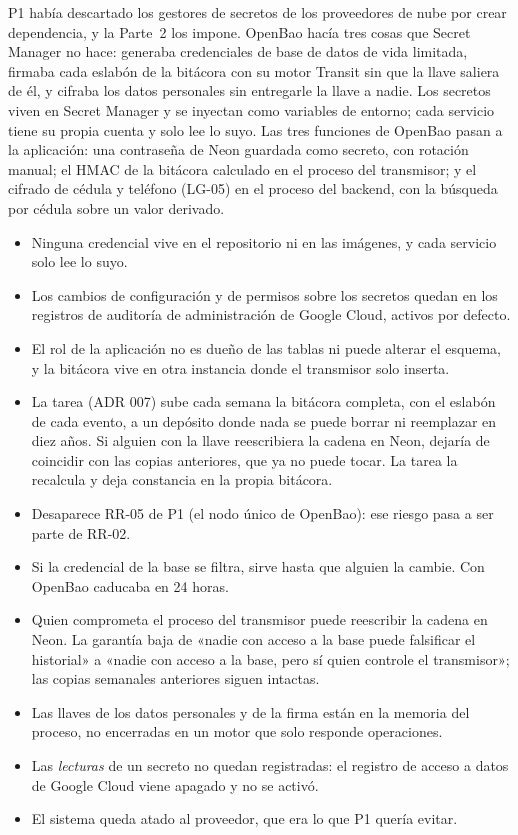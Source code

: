 \documentclass[11pt,a4paper]{article}
\theoremstyle{definition}
\theoremstyle{remark}
\begin{document}
\adrctx P1 había descartado los gestores de secretos de los proveedores de nube
por crear dependencia, y la Parte~2 los impone. OpenBao hacía tres cosas que
Secret Manager no hace: generaba credenciales de base de datos de vida
limitada, firmaba cada eslabón de la bitácora con su motor Transit sin que la
llave saliera de él, y cifraba los datos personales sin entregarle la llave a
nadie.
\adrdec Los secretos viven en Secret Manager y se inyectan como variables de
entorno; cada servicio tiene su propia cuenta y solo lee lo suyo. Las tres
funciones de OpenBao pasan a la aplicación: una contraseña de Neon guardada
como secreto, con rotación manual; el HMAC de la bitácora calculado en el
proceso del transmisor; y el cifrado de cédula y teléfono (LG-05) en el
proceso del backend, con la búsqueda por cédula sobre un valor derivado.
\adrpos
\begin{itemize}
  \item Ninguna credencial vive en el repositorio ni en las imágenes, y cada
    servicio solo lee lo suyo.
  \item Los cambios de configuración y de permisos sobre los secretos quedan
    en los registros de auditoría de administración de Google Cloud, activos
    por defecto.
  \item El rol de la aplicación no es dueño de las tablas ni puede alterar el
    esquema, y la bitácora vive en otra instancia donde el transmisor solo
    inserta.
  \item La tarea  (ADR 007) sube cada semana la bitácora completa,
    con el eslabón de cada evento, a un depósito donde nada se puede borrar ni
    reemplazar en diez años. Si alguien con la llave reescribiera la cadena en
    Neon, dejaría de coincidir con las copias anteriores, que ya no puede
    tocar. La tarea  la recalcula y deja constancia en la propia
    bitácora.
  \item Desaparece RR-05 de P1 (el nodo único de OpenBao): ese riesgo pasa a
    ser parte de RR-02.
\end{itemize}
\adrneg
\begin{itemize}
  \item Si la credencial de la base se filtra, sirve hasta que alguien la
    cambie. Con OpenBao caducaba en 24 horas.
  \item Quien comprometa el proceso del transmisor puede reescribir la cadena
    en Neon. La garantía baja de «nadie con acceso a la base puede falsificar
    el historial» a «nadie con acceso a la base, pero sí quien controle el
    transmisor»; las copias semanales anteriores siguen intactas.
  \item Las llaves de los datos personales y de la firma están en la memoria
    del proceso, no encerradas en un motor que solo responde operaciones.
  \item Las \emph{lecturas} de un secreto no quedan registradas: el registro
    de acceso a datos de Google Cloud viene apagado y no se activó.
  \item El sistema queda atado al proveedor, que era lo que P1 quería evitar.
\end{itemize}
\end{document}
